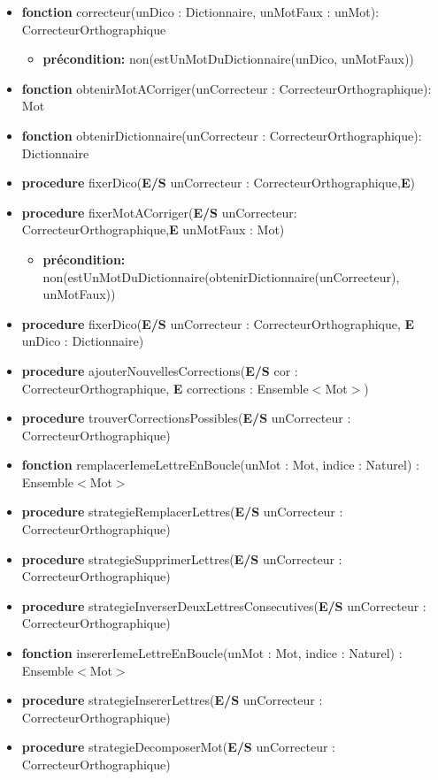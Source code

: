 	\begin{itemize}[label=$\ $, leftmargin=1cm]
		 
		 \item \textbf{fonction} correcteur(unDico : Dictionnaire, unMotFaux : unMot): CorrecteurOrthographique
		 \begin{itemize}[label=$| $]
            \item \textbf{précondition:} non(estUnMotDuDictionnaire(unDico, unMotFaux))
         \end{itemize}
		 \item \textbf{fonction} obtenirMotACorriger(unCorrecteur : CorrecteurOrthographique): Mot
		 \item \textbf{fonction} obtenirDictionnaire(unCorrecteur : CorrecteurOrthographique): Dictionnaire
		 \item \textbf{procedure} fixerDico(\textbf{E/S} unCorrecteur : CorrecteurOrthographique,\textbf{E})
		 \item \textbf{procedure} fixerMotACorriger(\textbf{E/S} unCorrecteur: CorrecteurOrthographique,\textbf{E} unMotFaux : Mot)
		 \begin{itemize}[label=$| $]
            \item \textbf{précondition:} non(estUnMotDuDictionnaire(obtenirDictionnaire(unCorrecteur), unMotFaux))
         \end{itemize}
		 \item \textbf{procedure} fixerDico(\textbf{E/S} unCorrecteur : CorrecteurOrthographique, \textbf{E} unDico : Dictionnaire)
		 \item \textbf{procedure} ajouterNouvellesCorrections(\textbf{E/S} cor : CorrecteurOrthographique, 
		 \textbf{E} corrections : Ensemble$<$Mot$>$)
		 \item \textbf{procedure} trouverCorrectionsPossibles(\textbf{E/S} unCorrecteur : CorrecteurOrthographique)
		 \item \textbf{fonction} remplacerIemeLettreEnBoucle(unMot : Mot, indice : Naturel) : Ensemble$<$Mot$>$
		 \item \textbf{procedure} strategieRemplacerLettres(\textbf{E/S} unCorrecteur : CorrecteurOrthographique)
		 \item \textbf{procedure} strategieSupprimerLettres(\textbf{E/S} unCorrecteur : CorrecteurOrthographique)
		 \item \textbf{procedure} strategieInverserDeuxLettresConsecutives(\textbf{E/S} unCorrecteur : CorrecteurOrthographique)
		 \item \textbf{fonction} insererIemeLettreEnBoucle(unMot : Mot, indice : Naturel) : Ensemble$<$Mot$>$
		 \item \textbf{procedure} strategieInsererLettres(\textbf{E/S} unCorrecteur : CorrecteurOrthographique)
		 \item \textbf{procedure} strategieDecomposerMot(\textbf{E/S} unCorrecteur : CorrecteurOrthographique)
		 
		 
		 
         
         
        
	\end{itemize} 
    
